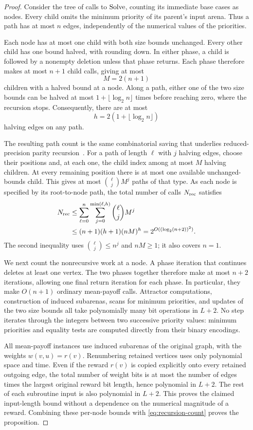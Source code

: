\begin{proof}
Consider the tree of calls to $\operatorname{Solve}$, counting its immediate base
cases as nodes.  Every child omits the minimum priority of its parent's
input arena.  Thus a path has at most $n$ edges, independently of the
numerical values of the priorities.

Each node has at most one child with both size bounds unchanged.
Every other child has one bound halved, with rounding down.  In either
phase, a child is followed by a nonempty deletion unless that phase
returns.  Each phase therefore makes at most $n+1$ child calls, giving
at most
\[
 M=2(n+1)
\]
children with a halved bound at a node.  Along a path, either one of the
two size bounds can be halved at most $1+\lfloor\log_2 n\rfloor$
times before reaching zero, where the recursion stops.  Consequently,
there are at most
\[
 h=2(1+\lfloor\log_2 n\rfloor)
\]
halving edges on any path.

The resulting path count is the same combinatorial saving that
underlies reduced-precision parity recursion~\cite{Parys2019}.
For a path of length $\ell$ with $j$ halving edges, choose their
positions and, at each one, the child index among at most $M$ halving
children.  At every remaining position there is at most one available
unchanged-bounds child.  This gives at most $\binom{\ell}{j}M^j$ paths
of that type.  As each node is specified by its root-to-node path, the
total number of calls $N_{\rm rec}$ satisfies
\begin{align}
\label{eq:recursion-count}
 N_{\rm rec}
 &\le \sum_{\ell=0}^{n}\sum_{j=0}^{\min(\ell,h)}
          \binom{\ell}{j}M^j\\
 &\le (n+1)(h+1)(nM)^h
  =2^{O((\log_2(n+2))^2)}.\nonumber
\end{align}
The second inequality uses $\binom{\ell}{j}\le n^j$ and $nM\ge1$;
it also covers $n=1$.

We next count the nonrecursive work at a node.  A phase iteration that
continues deletes at least one vertex.  The two phases together
therefore make at most $n+2$ iterations, allowing one final return
iteration for each phase.  In particular, they make $O(n+1)$ ordinary
mean-payoff calls.  Attractor computations, construction of induced
subarenas, scans for minimum priorities, and updates of the two size
bounds all take polynomially many bit operations in $L+2$.  No step
iterates through the integers between two successive priority values:
minimum priorities and equality tests are computed directly from their
binary encodings.

All mean-payoff instances use induced subarenas of the original graph,
with the weights $w(v,u)=r(v)$.  Renumbering retained vertices uses only
polynomial space and time.  Even if the reward $r(v)$ is copied
explicitly onto every retained outgoing edge, the total number of
weight bits is at most the number of edges times the largest original
reward bit length, hence polynomial in $L+2$.  The rest of each
subroutine input is also polynomial in $L+2$.  This proves the claimed
input-length bound without a dependence on the numerical magnitude
of a reward.  Combining these per-node bounds with
\eqref{eq:recursion-count} proves the proposition.
\end{proof}

